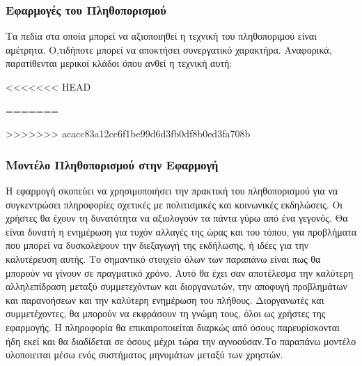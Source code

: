 \subsubsection{Εφαρμογές του Πληθοπορισμού}
Τα πεδία στα οποία μπορεί να αξιοποιηθεί η τεχνική του πληθοποριμού είναι αμέτρητα. Ο,τιδήποτε μπορεί να αποκτήσει συνεργατικό χαρακτήρα. Αναφορικά, παρατίθενται μερικοί κλάδοι όπου ανθεί η τεχνική αυτή:
\begin{description}[font=$\bullet$~\normalfont\color{black}]
\item [Εκπαίδευση]
\item [Οικονομία]
\item [Επιστήμη και Υγεία]
\item [ΙΤ]
\item [Διαφήμιση]
\item [Επιχειρηματικότητα]
<<<<<<< HEAD
\item [Κοινωνικές Εκδηλώσεις και \selectlanguage{english}\textit{NGO}\selectlanguage{greek}]
=======
\item [Κοινωνικές Εκδηλώσεις και ΜΚΟ]
>>>>>>> acacc83a12cc6f1be99d6d3fb0df8b0ed3fa708b
\end{description}

\subsubsection{Μοντέλο Πληθοπορισμού στην Εφαρμογή}
Η εφαρμογή σκοπεύει να χρησιμοποιήσει την πρακτική του πληθοπορισμού για να συγκεντρώσει πληροφορίες σχετικές με πολιτισμικές και κοινωνικές εκδηλώσεις. Οι χρήστες θα έχουν τη δυνατότητα να αξιολογούν τα πάντα γύρω από ένα γεγονός. Θα είναι δυνατή η ενημέρωση για τυχόν αλλαγές της ώρας και του τόπου, για προβλήματα που μπορεί να δυσκολέψουν την διεξαγωγή της εκδήλωσης, ή ιδέες για την καλυτέρευση αυτής. Το σημαντικό στοιχείο όλων των παραπάνω είναι πως θα μπορούν να γίνουν σε πραγματικό χρόνο. Αυτό θα έχει σαν αποτέλεσμα την καλύτερη αλληλεπίδραση μεταξύ συμμετεχόντων και διοργανωτών, την αποφυγή προβλημάτων και παρανοήσεων και την καλύτερη ενημέρωση του πλήθους. Διοργανωτές και συμμετέχοντες, θα μπορούν να εκφράσουν τη γνώμη τους, όλοι ως χρήστες της εφαρμογής. Η πληροφορία θα επικαιροποιείται διαρκώς από όσους παρευρίσκονται ήδη εκεί και θα διαδίδεται σε όσους μέχρι τώρα την αγνοούσαν.Το παραπάνω μοντέλο υλοποιειται μέσω ενός συστήματος μηνυμάτων μεταξύ των χρηστών. 

